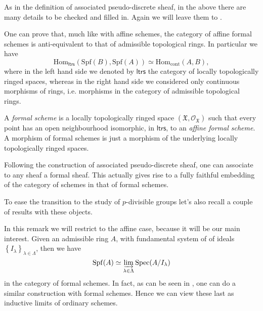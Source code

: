 \documentclass[../Main]{subfiles}
\begin{document}
\begin{rem}[]
	As in the definition of associated pseudo-discrete sheaf, in the above
	there are many details to be checked and filled in.
	Again we will leave them to \cite[Chapter I, \S10]{EGA}.
\end{rem}


\begin{rem}[]\label{EquivalenceFormalAffineSchemes}
	One can prove that, much like with affine schemes, the category of affine
	formal schemes is anti-equivalent to that of admissible topological rings.
	In particular we have
	\begin{equation*}
	\mathrm{Hom}_{\mathsf{ltrs}} \left( \mathrm{Spf}(B), \mathrm{Spf}(A) \right) \simeq
	\mathrm{Hom}_{ \mathrm{cont} } \left( A, B \right)
	,\end{equation*}
	where in the left hand side we denoted by $\mathsf{ltrs}$ the category of
	locally topologically ringed spaces, whereas in the right hand side
	we considered only continuous morphisms of rings, i.e. morphisms
	in the category of admissible topological rings.
\end{rem}


\begin{defn}
	A {\em formal scheme} is a locally topologically ringed space 
	$( \mathfrak{X} , \mathcal{O}_{ \mathfrak{X} } )$
	such that every point has an open neighbourhood isomorphic,
	in $\mathsf{ltrs}$, to an {\em affine formal scheme}.
	A morphism of formal schemes is just a morphism of the underlying
	locally topologically ringed spaces.
\end{defn}


\begin{rem}[]
	Following the construction of associated pseudo-discrete sheaf,
	one can associate to any sheaf a formal sheaf.
	This actually gives rise to a fully faithful embedding of the category of schemes
	in that of formal schemes.
\end{rem}


\noindent
To ease the transition to the study of $p$-divisible groups
let's also recall a couple of results with these objects.
\begin{rem}[]
	In this remark we will restrict to the affine case, because it will be
	our main interest.
	Given an admissible ring $A$, with fundamental system of
	of ideals $\left\{ I_\lambda \right\}_{\lambda \in \Lambda}$, then
	we have
	\begin{equation*}
	\mathrm{Spf}(A) \simeq \varinjlim_{\lambda \in \Lambda} \mathrm{Spec}(A/I_\lambda)
	\end{equation*}
	in the category of formal schemes.
	In fact, as can be seen in \cite[Chapter I, \S10.6]{EGA}, one can do a similar construction
	with formal schemes.
	Hence we can view these last as inductive limits of ordinary schemes.
\end{rem}
\end{document}
